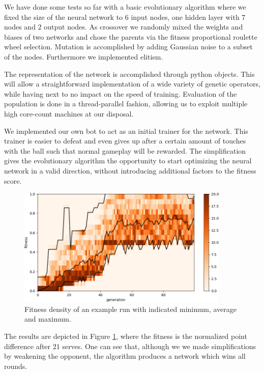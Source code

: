 \documentclass[11pt,a4paper]{scrartcl}
\begin{document}
We have done some tests so far with a basic evolutionary algorithm \cite{github_repo} where we fixed the size of the neural network to $6$ input nodes, one hidden layer with $7$ nodes and $2$ output nodes.
As crossover we randomly mixed the weights and biases of two networks and chose the parents via the fitness proportional roulette wheel selection.
Mutation is accomplished by adding Gaussian noise to a subset of the nodes.
Furthermore we implemented elitism.


The representation of the network is accomplished through python objects. This will allow a straightforward implementation of a wide variety of genetic operators, while having next to no impact on the speed of training.
Evaluation of the population is done in a thread-parallel fashion, allowing us to exploit multiple high core-count machines at our disposal.

We implemented our own bot to act as an initial trainer for the network. This trainer is easier to defeat and even gives up after a certain amount of touches with the ball such that normal gameplay will be rewarded.
The simplification gives the evolutionary algorithm the opportunity to start optimizing the neural network in a valid direction, without introducing additional factors to the fitness score.

\begin{figure}[H]
\center
\includegraphics[width=0.9\textwidth]{img/fitness.png}
\caption{Fitness density of an example run with indicated minimum, average and maximum.}
\label{fig:train}
\end{figure}

The results are depicted in Figure \ref{fig:train}, where the fitness is the normalized point difference after $21$ serves.
One can see that, although we we made simplifications by weakening the opponent, the algorithm produces a network which wins all rounds.
\end{document}
